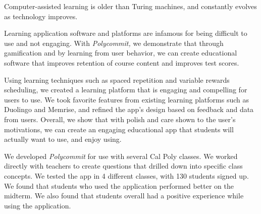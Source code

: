 \par Computer-assisted learning is older than Turing machines, and constantly evolves as technology improves. 

\par Learning application software and platforms are infamous for being difficult to use and not engaging. With \textit{Polycommit,} we demonstrate that through gamification and by learning from user behavior, we can create educational software that improves retention of course content and improves test scores.

\par Using learning techniques such as spaced repetition and variable rewards scheduling, we created a learning platform that is engaging and compelling for users to use. We took favorite features from existing learning platforms such as Duolingo and Memrise, and refined the app's design based on feedback and data from users. Overall, we show that with polish and care shown to the user's motivations, we can create an engaging educational app that students will actually want to use, and enjoy using.

\par We developed \textit{Polycommit} for use with several Cal Poly classes. We worked directly with teachers to create questions that drilled down into specific class concepts. We tested the app in 4 different classes, with 130 students signed up. We found that students who used the application performed better on the midterm. We also found that students overall had a positive experience while using the application.